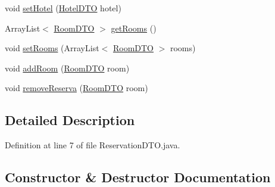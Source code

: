 \begin{DoxyCompactItemize}
\item 
void \mbox{\hyperlink{classbspq18__e4_1_1_gestion_hotelera_1_1server_1_1dto_1_1_reservation_d_t_o_a86857fe8f27c9a95a00eeb7997bafe3a}{set\+Hotel}} (\mbox{\hyperlink{classbspq18__e4_1_1_gestion_hotelera_1_1server_1_1dto_1_1_hotel_d_t_o}{Hotel\+D\+TO}} hotel)
\item 
Array\+List$<$ \mbox{\hyperlink{classbspq18__e4_1_1_gestion_hotelera_1_1server_1_1dto_1_1_room_d_t_o}{Room\+D\+TO}} $>$ \mbox{\hyperlink{classbspq18__e4_1_1_gestion_hotelera_1_1server_1_1dto_1_1_reservation_d_t_o_ada63840d2c1dc2bdb635885f77136dd1}{get\+Rooms}} ()
\item 
void \mbox{\hyperlink{classbspq18__e4_1_1_gestion_hotelera_1_1server_1_1dto_1_1_reservation_d_t_o_a1e1d3df6f656f62dbd76bd18dca77173}{set\+Rooms}} (Array\+List$<$ \mbox{\hyperlink{classbspq18__e4_1_1_gestion_hotelera_1_1server_1_1dto_1_1_room_d_t_o}{Room\+D\+TO}} $>$ rooms)
\item 
void \mbox{\hyperlink{classbspq18__e4_1_1_gestion_hotelera_1_1server_1_1dto_1_1_reservation_d_t_o_ab0c54a6b7c8f481b3f83caeebf214506}{add\+Room}} (\mbox{\hyperlink{classbspq18__e4_1_1_gestion_hotelera_1_1server_1_1dto_1_1_room_d_t_o}{Room\+D\+TO}} room)
\item 
void \mbox{\hyperlink{classbspq18__e4_1_1_gestion_hotelera_1_1server_1_1dto_1_1_reservation_d_t_o_a7853edac1e3062cafa4be43ed8d24173}{remove\+Reserva}} (\mbox{\hyperlink{classbspq18__e4_1_1_gestion_hotelera_1_1server_1_1dto_1_1_room_d_t_o}{Room\+D\+TO}} room)
\end{DoxyCompactItemize}


\subsection{Detailed Description}


Definition at line 7 of file Reservation\+D\+T\+O.\+java.



\subsection{Constructor \& Destructor Documentation}
\mbox{\label{classbspq18__e4_1_1_gestion_hotelera_1_1server_1_1dto_1_1_reservation_d_t_o_aebeec3ade8cb634be38e808eef8bc257}} 
